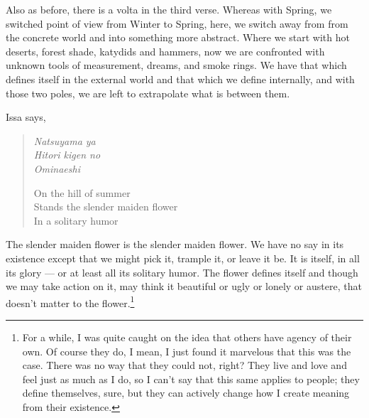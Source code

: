 \documentclass[12pt]{memoir}
\begin{document}
Also as before, there is a volta in the third verse. Whereas with Spring, we switched point of view from Winter to Spring, here, we switch away from from the concrete world and into something more abstract. Where we start with hot deserts, forest shade, katydids and hammers, now we are confronted with unknown tools of measurement, dreams, and smoke rings. We have that which defines itself in the external world and that which we define internally, and with those two poles, we are left to extrapolate what is between them.

Issa says,

\begin{verse}
\begin{multicols}{2}
\emph{Natsuyama ya} \\
\emph{Hitori kigen no} \\
\emph{Ominaeshi}

\columnbreak

On the hill of summer \\
Stands the slender maiden flower \\
In a solitary humor
\end{multicols}
\vspace{-1em}
\parencite[65]{issa}
\end{verse}

The slender maiden flower is the slender maiden flower. We have no say in its existence except that we might pick it, trample it, or leave it be. It is itself, in all its glory --- or at least all its solitary humor. The flower defines itself and though we may take action on it, may think it beautiful or ugly or lonely or austere, that doesn't matter to the flower.\footnote{For a while, I was quite caught on the idea that others have agency of their own. Of course they do, I mean, I just found it marvelous that this was the case. There was no way that they could not, right? They live and love and feel just as much as I do, so I can't say that this same applies to people; they define themselves, sure, but they can actively change how I create meaning from their existence.\footnotemark}
\end{document}
